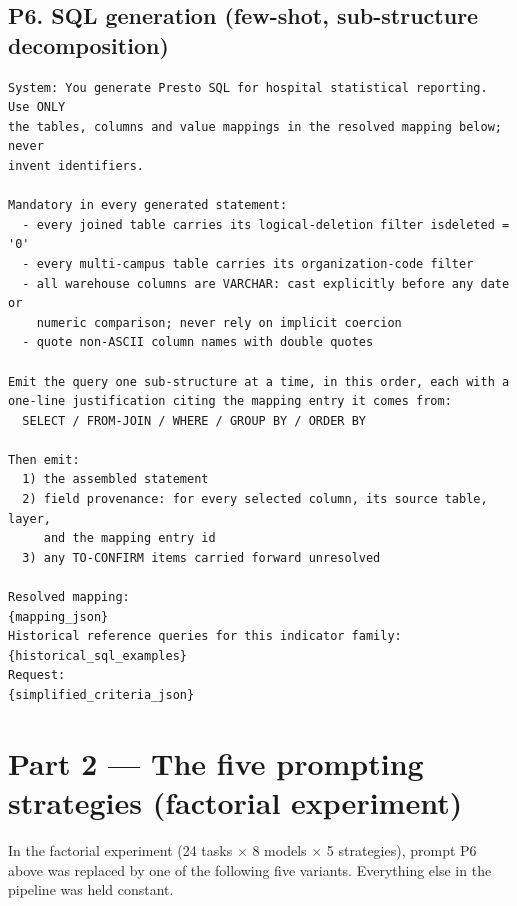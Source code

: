 \documentclass[10pt]{article}
\begin{document}
\subsection{P6. SQL generation (few-shot, sub-structure decomposition)}
\begin{Verbatim}[fontsize=\footnotesize,frame=single,framesep=4pt]
System: You generate Presto SQL for hospital statistical reporting. Use ONLY
the tables, columns and value mappings in the resolved mapping below; never
invent identifiers.

Mandatory in every generated statement:
  - every joined table carries its logical-deletion filter isdeleted = '0'
  - every multi-campus table carries its organization-code filter
  - all warehouse columns are VARCHAR: cast explicitly before any date or
    numeric comparison; never rely on implicit coercion
  - quote non-ASCII column names with double quotes

Emit the query one sub-structure at a time, in this order, each with a
one-line justification citing the mapping entry it comes from:
  SELECT / FROM-JOIN / WHERE / GROUP BY / ORDER BY

Then emit:
  1) the assembled statement
  2) field provenance: for every selected column, its source table, layer,
     and the mapping entry id
  3) any TO-CONFIRM items carried forward unresolved

Resolved mapping:
{mapping_json}
Historical reference queries for this indicator family:
{historical_sql_examples}
Request:
{simplified_criteria_json}
\end{Verbatim}

\section{Part 2 --- The five prompting strategies (factorial experiment)}

\noindent
In the factorial experiment (24 tasks $\times$ 8 models $\times$ 5 strategies),
prompt P6 above was replaced by one of the following five variants. Everything
else in the pipeline was held constant.
\end{document}
